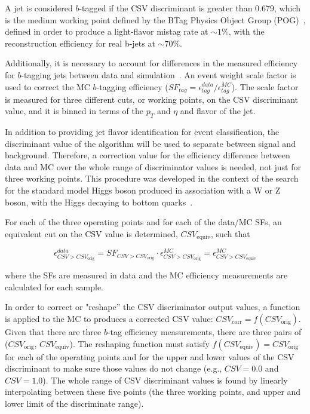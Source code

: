 \par A jet is considered $b$-tagged if the CSV discriminant is greater
than 0.679, which is the medium working point defined by the BTag
Physics Object Group (POG)~\cite{btagOP}, defined in order to produce
a light-flavor mistag rate at $\sim1\%$, with the reconstruction
efficiency for real b-jets at $\sim70\%$.  

\par Additionally, it is necessary to account for differences in the
measured efficiency for $b$-tagging jets between data and
simulation~\cite{CMS-PAS-BTV-11-004}.
An event weight scale factor is used to correct the MC $b$-tagging efficiency ($SF_{tag} =
\epsilon_{tag}^{data}/\epsilon_{tag}^{MC}$).  The scale factor is
measured for three different cuts, or working points, on the CSV
discriminant value, and it is binned in terms of the $p_{T}$ and
$\eta$ and flavor of the jet.  

\par In addition to providing jet flavor identification for event
classification, the discriminant value of the algorithm will be used
to separate between \ttH signal and \ttjets background.  Therefore, a
correction value for the efficiency difference between data and MC over the whole range
of discriminator values is needed, not just for three working points.
This procedure was developed in the context of the search for the
standard model Higgs boson produced in association with a W or Z
boson, with the Higgs decaying to bottom
quarks~\cite{CMS-AN-2012-181}.  

\par For each of the three operating points and for each of the
data/MC SFs, an equivalent cut on the CSV value is determined,
\(CSV_{\mathrm{equiv}}\), such that 

\begin{equation}\label{eq:csv_reweight}
\epsilon^{data}_{CSV>CSV_{\mathrm{orig}}} = SF_{CSV>CSV_{\mathrm{orig}}}\cdot\epsilon^{MC}_{CSV>CSV_{\mathrm{orig}}} = \epsilon^{MC}_{CSV>CSV_{\mathrm{equiv}}}
\end{equation}

\noindent where the SFs are measured in data and the MC efficiency
measurements are calculated for each sample.

\par In order to correct or "reshape'' the CSV discriminator output
values, a function is applied to the MC to produces a corrected CSV value:
$CSV_{\mathrm{corr}}=f(CSV_{\mathrm{orig}})$.  Given that there are
three $b$-tag efficiency measurements, there are three pairs of
($CSV_{\mathrm{orig}}$, $CSV_{\mathrm{equiv}}$). The reshaping
function must satisfy $f(CSV_{\mathrm{equiv}}) =
CSV_{\mathrm{orig}}$ for each of the operating points and for the upper
and lower values of the CSV discriminant to make sure those values do
not change (e.g., $CSV = 0.0$ and $CSV = 1.0$).  The whole range of
CSV discriminant values is found by linearly interpolating between
these five points (the three working points, and upper and lower limit
of the discriminate range).


